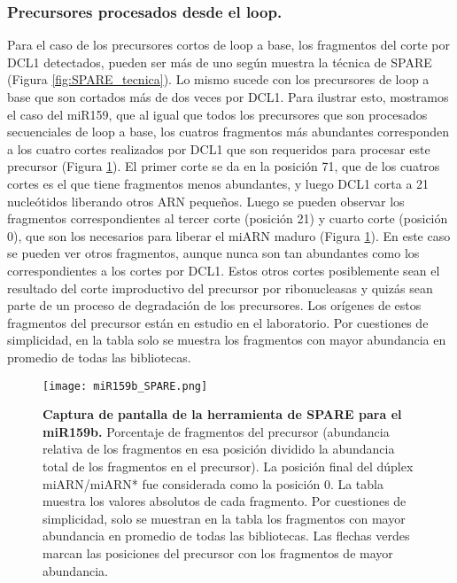 \subsubsection{Precursores procesados desde el loop.}

Para el caso de los precursores cortos de loop a base, los fragmentos del corte por DCL1 detectados, pueden ser más de uno según muestra la técnica de SPARE (Figura \ref{fig:SPARE_tecnica}).
Lo mismo sucede con los precursores de loop a base que son cortados más de dos veces por DCL1.
Para ilustrar esto, mostramos  el caso del miR159, que al igual que todos los precursores que son procesados secuenciales de loop a base, los cuatros fragmentos más abundantes corresponden a los cuatro cortes realizados por DCL1 que son requeridos para procesar este precursor (Figura \ref{fig:miR159b_SPARE}).
El primer corte se da en la posición 71, que de los cuatros cortes es el que tiene fragmentos menos abundantes, y luego DCL1 corta a 21 nucleótidos liberando otros ARN pequeños.
Luego se pueden observar los fragmentos correspondientes al tercer corte (posición 21) y cuarto corte (posición 0), que son los necesarios para liberar el miARN maduro (Figura \ref{fig:miR159b_SPARE}).
En este caso se pueden ver otros fragmentos, aunque nunca son tan abundantes como los correspondientes a los cortes por DCL1.
Estos otros cortes posiblemente sean el resultado del corte improductivo del precursor por ribonucleasas y quizás sean parte de un proceso de degradación de los precursores.
Los orígenes de estos fragmentos del precursor están en estudio en el laboratorio.
Por cuestiones de simplicidad, en la tabla solo se muestra los fragmentos con mayor abundancia en promedio de todas las bibliotecas.


\begin{landscape}
    \begin{figure}[htbp!] 
        \centering    
        \texttt{[image: miR159b\_SPARE.png]}
		\caption[Captura de pantalla de la herramienta de SPARE para el miR159b]{
        \textbf{Captura de pantalla de la herramienta de SPARE para el miR159b.}
        Porcentaje de fragmentos del precursor (abundancia relativa de los fragmentos en esa posición dividido la abundancia total de los fragmentos en el precursor).
        La posición final del dúplex miARN/miARN* fue considerada como la posición 0.
        La tabla muestra los valores absolutos de cada fragmento.
        Por cuestiones de simplicidad, solo se muestran en la tabla los fragmentos con mayor abundancia en promedio de todas las bibliotecas.
        Las flechas verdes marcan las posiciones del precursor con los fragmentos de mayor abundancia.
        }
		\label{fig:miR159b_SPARE}
    \end{figure}
\end{landscape}



